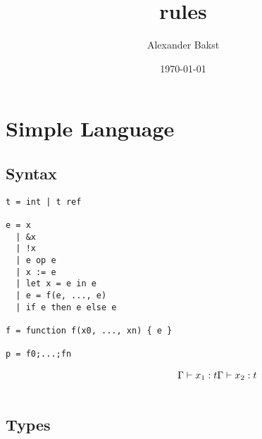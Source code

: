 \documentclass[11pt]{article}
\title{rules}
\author{Alexander Bakst}
\date{\today}
\begin{document}
\maketitle

\setcounter{tocdepth}{3}
\tableofcontents
\vspace*{1cm}
\section{Simple Language}
\label{sec-1}
\subsection{Syntax}
\label{sec-1-1}


\begin{verbatim}
t = int | t ref

e = x
  | &x
  | !x
  | e op e
  | x := e
  | let x = e in e
  | e = f(e, ..., e)
  | if e then e else e

f = function f(x0, ..., xn) { e }    

p = f0;...;fn
\end{verbatim}

   \begin{align*}
   \Gamma \vdash x_1:t \Gamma \vdash x_2:t \\
   \cline{1-2}
   \end{align*}
\subsection{Types}
\label{sec-1-2}
\end{document}
